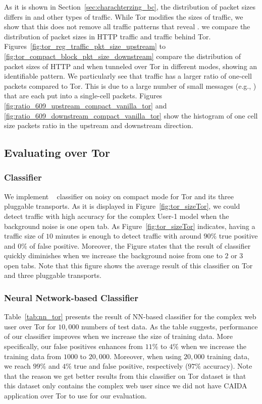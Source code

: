 As it is shown in Section~\ref{sec:charachterzing_bc}, the distribution of packet sizes differs in \bc and other types of traffic. While Tor modifies the sizes of \bc traffic, we show that this does not remove all traffic patterns that reveal \bc.
we compare the distribution of packet sizes in HTTP traffic and \bc traffic behind Tor. 
Figures~\ref{fig:tor_reg_traffic_pkt_size_upstream} to \ref{fig:tor_compact_block_pkt_size_downstream} 
 compare the distribution of packet sizes of HTTP and \bc when tunneled over Tor in different modes, showing an identifiable pattern.
We particularly see that \bc traffic has a larger ratio of one-cell packets compared to Tor. This is due to a large number of small \bc messages (e.g., ) that are each put into a single-cell packets. Figures \ref{fig:ratio_609_upstream_compact_vanilla_tor} and \ref{fig:ratio_609_downstream_compact_vanilla_tor} show the histogram of one cell size packets ratio in the upstream and downstream direction. 
\subsection{Evaluating \bc over Tor}
\subsubsection{ Classifier}
We implement ~ classifier on noisy \bc on compact mode for Tor and its three pluggable transports. As it is displayed in Figure~\ref{fig:tor_sizeTor}, we could detect \bc traffic with high accuracy for the complex User-1 model when the background noise is one open tab. As Figure~\ref{fig:tor_sizeTor} indicates, having a traffic size of $10$ minutes is
enough to detect \bc traffic with around $90\%$ true positive and $0\%$ of false positive. Moreover, the Figure states that the result of classifier quickly diminishes when we increase the background noise from one to $2$ or $3$ open tabs.
Note that this figure shows the average result of this classifier on Tor and three pluggable transports.
\subsubsection{Neural Network-based Classifier}
Table~\ref{tab:nn_tor} presents the result of NN-based classifier for the complex web user over Tor for $10,000$ numbers of test data. As the table suggests, performance of our classifier improves when we increase the size of training data. More specifically, our false positives enhances from $11\%$ to $4\%$ when we increase the training data from $1000$ to $20,000$. Moreover, when using $20,000$ training data, we reach $99\%$ and $4\%$ true and false positive, respectively ($97\%$ accuracy). Note that the reason we get better results from this classifier on Tor dataset is that this dataset only contains the complex web user since we did not have CAIDA application over Tor to use for our evaluation.


